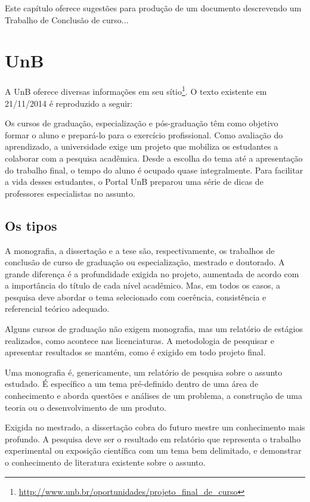 Este capítulo oferece sugestões para produção de um documento descrevendo um Trabalho de Conclusão de curso...

\section{UnB}%
A \acrlong{UnB} oferece diversas informações em seu sítio\footnote{\url{http://www.unb.br/oportunidades/projeto_final_de_curso}}. O texto existente em 21/11/2014 é
reproduzido a seguir:

\selectfont%
Os cursos de graduação, especialização e pós-graduação têm como objetivo formar o aluno e prepará-lo para o exercício profissional. Como avaliação do aprendizado, a universidade exige um projeto que mobiliza os estudantes a colaborar com a pesquisa acadêmica. Desde a escolha do tema até a apresentação do trabalho final, o tempo do aluno é ocupado quase integralmente. Para facilitar a vida desses estudantes, o Portal UnB preparou uma série de dicas de professores especialistas no assunto.

\subsection{Os tipos}
A monografia, a dissertação e a tese são, respectivamente, os trabalhos de conclusão de curso de graduação ou especialização, mestrado e doutorado. A grande diferença é a profundidade exigida no projeto, aumentada de acordo com a importância do título de cada nível acadêmico. Mas, em todos os casos, a pesquisa deve abordar o tema selecionado com coerência, consistência e referencial teórico adequado.

Alguns cursos de graduação não exigem monografia, mas um relatório de estágios realizados, como acontece nas licenciaturas. A metodologia de pesquisar e apresentar resultados se mantém, como é exigido em todo projeto final.

Uma monografia é, genericamente, um relatório de pesquisa sobre o assunto estudado. É específico a um tema pré-definido dentro de uma área de conhecimento e aborda questões e análises de um problema, a construção de uma teoria ou o desenvolvimento de um produto.

Exigida no mestrado, a dissertação cobra do futuro mestre um conhecimento mais profundo. A pesquisa deve ser o resultado em relatório que representa o trabalho experimental ou exposição científica com um tema bem delimitado, e demonstrar o conhecimento de literatura existente sobre o assunto.

